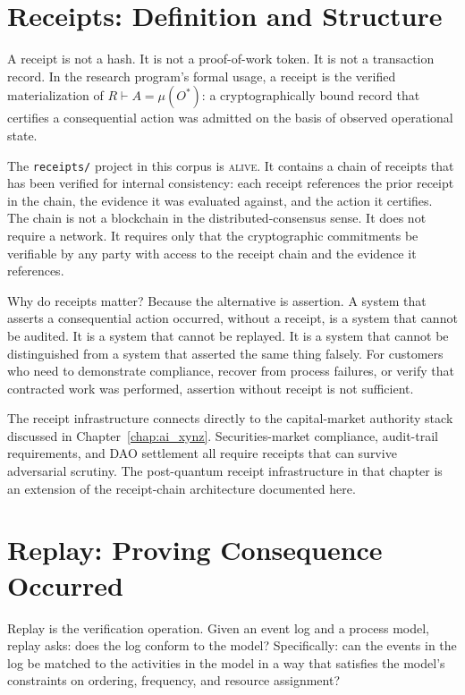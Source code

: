 \section{Receipts: Definition and Structure}

A receipt is not a hash. It is not a proof-of-work token. It is not a transaction record. In the research program's formal usage, a receipt is the verified materialization of $R \vdash A = \mu(O^{*})$: a cryptographically bound record that certifies a consequential action was admitted on the basis of observed operational state.

The \texttt{receipts/} project in this corpus is \textsc{alive}. It contains a chain of receipts that has been verified for internal consistency: each receipt references the prior receipt in the chain, the evidence it was evaluated against, and the action it certifies. The chain is not a blockchain in the distributed-consensus sense. It does not require a network. It requires only that the cryptographic commitments be verifiable by any party with access to the receipt chain and the evidence it references.

Why do receipts matter? Because the alternative is assertion. A system that asserts a consequential action occurred, without a receipt, is a system that cannot be audited. It is a system that cannot be replayed. It is a system that cannot be distinguished from a system that asserted the same thing falsely. For customers who need to demonstrate compliance, recover from process failures, or verify that contracted work was performed, assertion without receipt is not sufficient.

The receipt infrastructure connects directly to the capital-market authority stack discussed in Chapter~\ref{chap:ai_xynz}. Securities-market compliance, audit-trail requirements, and DAO settlement all require receipts that can survive adversarial scrutiny. The post-quantum receipt infrastructure in that chapter is an extension of the receipt-chain architecture documented here.

\section{Replay: Proving Consequence Occurred}

Replay is the verification operation. Given an event log and a process model, replay asks: does the log conform to the model? Specifically: can the events in the log be matched to the activities in the model in a way that satisfies the model's constraints on ordering, frequency, and resource assignment?

